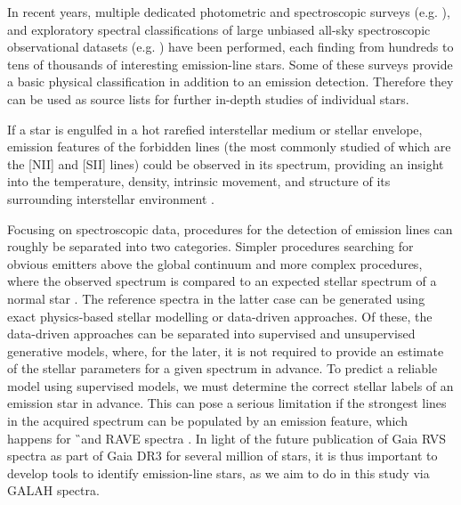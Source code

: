 In recent years, multiple dedicated photometric and spectroscopic surveys (e.g. \cite{2008MNRAS.384.1277W, 2008MNRAS.388.1879M, 2012ApJS..200...14M, 2012AJ....143...61N, 2014MNRAS.440.2036D, 2016MNRAS.456.1424A, 2016ASPC..505...66N}), and exploratory spectral classifications of large unbiased all-sky spectroscopic observational datasets (e.g. \cite{1999A&AS..134..255K, 2012MNRAS.425..355R, 2015A&A...581A..52T, 2016ASPC..505...66N, 2016RAA....16..138H, 2017ApJS..228...24T}) have been performed, each finding from hundreds to tens of thousands of interesting emission-line stars. Some of these surveys provide a basic physical classification in addition to an emission detection. Therefore they can be used as source lists for further in-depth studies of individual stars.

If a star is engulfed in a hot rarefied interstellar medium or stellar envelope, emission features of the forbidden lines (the most commonly studied of which are the [NII] and [SII] lines) could be observed in its spectrum, providing an insight into the temperature, density, intrinsic movement, and structure of its surrounding interstellar environment \cite{1973ApJ...184...93B, 1993Ap&SS.204..205R, 2005MNRAS.361..813E, 2016A&A...591A..74D, 2017A&A...604A.135D}.

Focusing on spectroscopic data, procedures for the detection of emission lines can roughly be separated into two categories. Simpler procedures searching for obvious emitters above the global continuum \cite{2015A&A...581A..52T, 2016ASPC..505...66N, 2016RAA....16..138H, 2016ASPC..505...66N} and more complex procedures, where the observed spectrum is compared to an expected stellar spectrum of a normal star \cite{2013ApJ...776..127Z}. The reference spectra in the latter case can be generated using exact physics-based stellar modelling or data-driven approaches. Of these, the data-driven approaches can be separated into supervised and unsupervised generative models, where, for the later, it is not required to provide an estimate of the stellar parameters for a given spectrum in advance. To predict a reliable model using supervised models, we must determine the correct stellar labels of an emission star in advance. This can pose a serious limitation if the strongest lines in the acquired spectrum can be populated by an emission feature, which happens for \G\ and RAVE spectra \cite{2013ApJ...776..127Z}. In light of the future publication of Gaia RVS spectra as part of Gaia DR3 for several million of stars, it is thus important to develop tools to identify emission-line stars, as we aim to do in this study via GALAH spectra.

